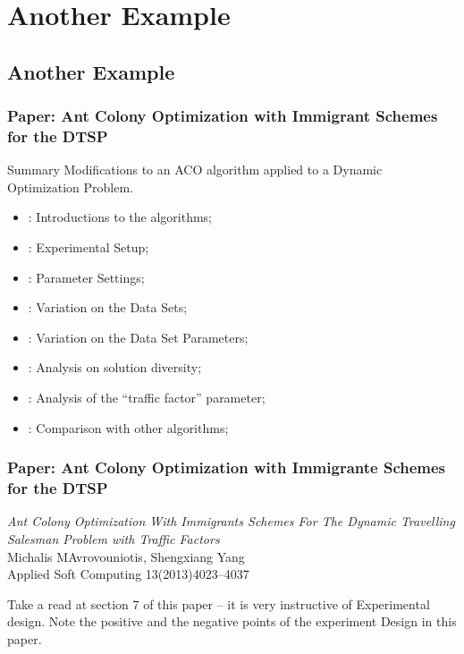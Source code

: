 \documentclass[10pt]{beamer}
\begin{document}
\section{Another Example}
\subsection{Another Example}
\begin{frame}
  \frametitle{Paper: Ant Colony Optimization with Immigrant Schemes for the DTSP}
  \begin{block}{Summary}
    Modifications to an ACO algorithm applied to a Dynamic Optimization Problem.
  \end{block}
  \begin{itemize}
  \item {}: Introductions to the algorithms;
  \item {}: Experimental Setup;
  \item {}: Parameter Settings;
  \item {}: Variation on the Data Sets;
  \item {}: Variation on the Data Set Parameters;
  \item {}: Analysis on solution diversity;
  \item {}: Analysis of the ``traffic factor'' parameter;
  \item {}: Comparison with other algorithms;
  \end{itemize}
\end{frame}

\begin{frame}
  \frametitle{Paper: Ant Colony Optimization with Immigrante Schemes for the DTSP}

  \begin{block}{}
    \emph{Ant Colony Optimization With Immigrants Schemes For The
      Dynamic Travelling Salesman Problem with Traffic Factors}\\
    Michalis MAvrovouniotis, Shengxiang Yang\\
    Applied Soft Computing 13(2013)4023--4037
  \end{block}
  
  \vfill

  Take a read at section 7 of this paper -- it is very instructive of
  Experimental design.  Note the
  positive and the negative points of the experiment Design in this
  paper.
\end{frame}
\end{document}
